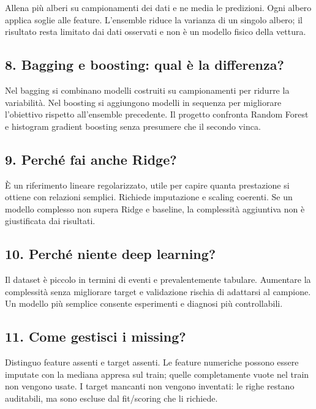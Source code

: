 \documentclass[11pt,a4paper]{article}
\begin{document}
Allena più alberi su campionamenti dei dati e ne media le predizioni. Ogni albero applica soglie alle feature. L'ensemble riduce la varianza di un singolo albero; il risultato resta limitato dai dati osservati e non è un modello fisico della vettura.

\subsection{8. Bagging e boosting: qual è la differenza?}\label{bagging-e-boosting-qual-uxe8-la-differenza}

Nel bagging si combinano modelli costruiti su campionamenti per ridurre la variabilità. Nel boosting si aggiungono modelli in sequenza per migliorare l'obiettivo rispetto all'ensemble precedente. Il progetto confronta Random Forest e histogram gradient boosting senza presumere che il secondo vinca.

\subsection{9. Perché fai anche Ridge?}\label{perchuxe9-fai-anche-ridge}

È un riferimento lineare regolarizzato, utile per capire quanta prestazione si ottiene con relazioni semplici. Richiede imputazione e scaling coerenti. Se un modello complesso non supera Ridge e baseline, la complessità aggiuntiva non è giustificata dai risultati.

\subsection{10. Perché niente deep learning?}\label{perchuxe9-niente-deep-learning}

Il dataset è piccolo in termini di eventi e prevalentemente tabulare. Aumentare la complessità senza migliorare target e validazione rischia di adattarsi al campione. Un modello più semplice consente esperimenti e diagnosi più controllabili.

\subsection{11. Come gestisci i missing?}\label{come-gestisci-i-missing}

Distinguo feature assenti e target assenti. Le feature numeriche possono essere imputate con la mediana appresa sul train; quelle completamente vuote nel train non vengono usate. I target mancanti non vengono inventati: le righe restano auditabili, ma sono escluse dal fit/scoring che li richiede.
\end{document}
